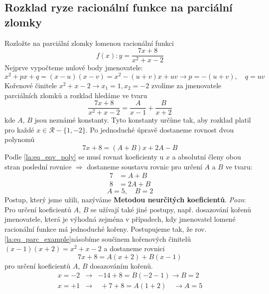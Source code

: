     \subsection{Rozklad ryze racionální funkce na parci\-ální zlomky}
      \begin{example} 
        Rozložte na parciální zlomky lomenou racionální funkci
          $$f(x):y=\frac{7x+8}{x^2+x-2}$$
        Nejprve vypočteme nulové body jmenovatele:
          $$x^2+px+q=(x-u)(x-v)=x^2-(u+v)x+uv\rightarrow p=-(u+v),\quad q=uv$$
        Kořenové činitele  $x^2+x-2\rightarrow x_1=1, x_2=-2$ zvolíme za jmenovatele parciálních
        zlomků a rozklad hledáme ve tvaru $$\frac{7x+8}{x^2+x-2}=\frac{A}{x-1}+\frac{B}{x+2}$$
        kde $A$, $B$ jsou neznámé konstanty. Tyto konstanty určíme tak, aby rozklad platil pro každé
        $x\in\mathcal{R}-\{1,-2\}$. Po jednoduché úpravě dostaneme rovnost dvou polynomů
          $$7x+8=(A+B)x+2A-B$$
        Podle \ref{la:eq_eqv_poly} se musí rovnat koeficienty u $x$ a absolutní členy obou stran
        poslední rovnice $\Rightarrow$ dostaneme soustavu rovnic pro určení $A$ a $B$ ve tvaru:
          \begin{align}\label{la:eq_parc_example}
            7 &= A+B \\ \nonumber
            8 &= 2A+B   
          \end{align}
          $$A=5,\quad B=2 $$
        Postup, který jsme užili, nazýváme \textbf{Metodou neurčitých koeficientů}.\newline
        \emph{Pozn}: Pro určení koeficientů $A$, $B$ se užívají také jiné postupy, např. dosazování
        kořenů jmenovatele, která je výhodná zejména v případech, kdy jmenovatel lomené racionální
        funkce má jednoduché kořeny. Postupujeme tak, že rov. \ref{la:eq_parc_example}násobíme
        součinem kořenových činitelů $(x-1)(x+2)=x^2+x-2$ a dostaneme rovnici $$7x+8=A(x+2)+B(x-1)$$
        pro určení koeficientů $A$, $B$ dosazováním kořenů.
          \begin{align*}
            x=-2 &\rightarrow& -14+8=B(-2-1) \rightarrow B=2\\
            x=+1 &\rightarrow&  \,\,+7+8=A(1+2)\quad  \rightarrow A=5
          \end{align*}
      \end{example}      
